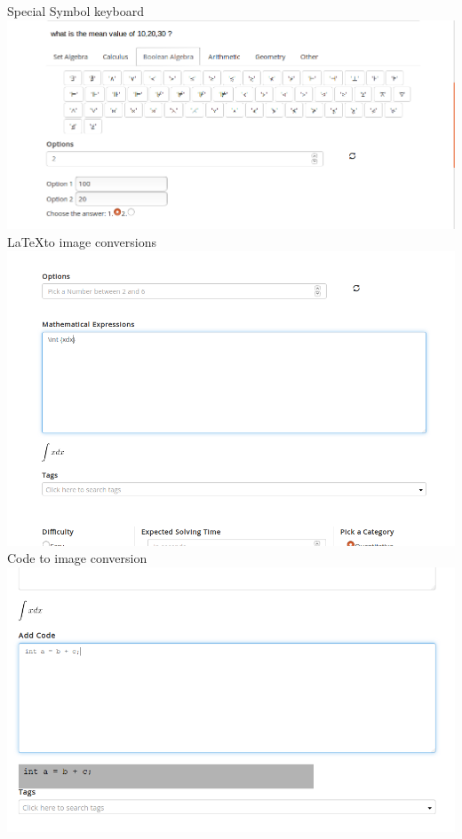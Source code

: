 \documentclass[a4paper,12pt,oneside]{book}
\begin{document}
\vspace{1in}
Special Symbol keyboard\\
\includegraphics[scale=0.4]{compose4.png}	\\

\vspace{0.7in}
\LaTeX to image conversions\\
\includegraphics[scale=0.4]{compose5.png}	\\

\vspace{2in}
\newpage Code to image conversion \\
\includegraphics[scale=0.45]{compose7.png}	\\
\end{document}
